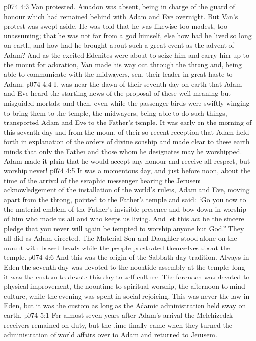 \vs p074 4:3 Van protested. Amadon was absent, being in charge of the guard of honour which had remained behind with Adam and Eve overnight. But Van’s protest was swept aside. He was told that he was likewise too modest, too unassuming; that he was not far from a god himself, else how had he lived so long on earth, and how had he brought about such a great event as the advent of Adam? And as the excited Edenites were about to seize him and carry him up to the mount for adoration, Van made his way out through the throng and, being able to communicate with the midwayers, sent their leader in great haste to Adam.
\vs p074 4:4 It was near the dawn of their seventh day on earth that Adam and Eve heard the startling news of the proposal of these well\hyp{}meaning but misguided mortals; and then, even while the passenger birds were swiftly winging to bring them to the temple, the midwayers, being able to do such things, transported Adam and Eve to the Father’s temple. It was early on the morning of this seventh day and from the mount of their so recent reception that Adam held forth in explanation of the orders of divine sonship and made clear to these earth minds that only the Father and those whom he designates may be worshipped. Adam made it plain that he would accept any honour and receive all respect, but worship never!
\vs p074 4:5 It was a momentous day, and just before noon, about the time of the arrival of the seraphic messenger bearing the Jerusem acknowledgement of the installation of the world’s rulers, Adam and Eve, moving apart from the throng, pointed to the Father’s temple and said: “Go you now to the material emblem of the Father’s invisible presence and bow down in worship of him who made us all and who keeps us living. And let this act be the sincere pledge that you never will again be tempted to worship anyone but God.” They all did as Adam directed. The Material Son and Daughter stood alone on the mount with bowed heads while the people prostrated themselves about the temple.
\vs p074 4:6 \pc And this was the origin of the Sabbath\hyp{}day tradition. Always in Eden the seventh day was devoted to the noontide assembly at the temple; long it was the custom to devote this day to self\hyp{}culture. The forenoon was devoted to physical improvement, the noontime to spiritual worship, the afternoon to mind culture, while the evening was spent in social rejoicing. This was never the law in Eden, but it was the custom as long as the Adamic administration held sway on earth.
\vs p074 5:1 For almost seven years after Adam’s arrival the Melchizedek receivers remained on duty, but the time finally came when they turned the administration of world affairs over to Adam and returned to Jerusem.
